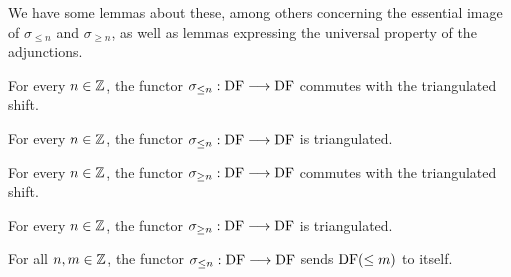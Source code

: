 \begin{definition}
\label{def-truncGEι}
\leanok
{}


\end{definition}

We have some lemmas about these, among others concerning the essential image of $\sigma_{\le n}$ and $\sigma_{\ge n}$, as well as lemmas
expressing the universal property of the adjunctions.

\begin{definition}
\label{def-truncLE_shift}
\leanok
{}

For every $n\in\mathbb{Z}$, the functor $\sigma_{\le n} : \operatorname{DF} \longrightarrow \operatorname{DF}$ commutes with the triangulated shift.

\end{definition}

\begin{proposition}
\label{prop-truncLE_tri}
\leanok
{}

For every $n\in\mathbb{Z}$, the functor $\sigma_{\le n} : \operatorname{DF} \longrightarrow \operatorname{DF}$ is triangulated.

\end{proposition}

\begin{definition}
\label{def-truncGE_shift}
\leanok
{}

For every $n\in\mathbb{Z}$, the functor $\sigma_{\ge n} : \operatorname{DF} \longrightarrow \operatorname{DF}$ commutes with the triangulated shift.

\end{definition}

\begin{proposition}
\label{prop-truncGE_tri}
\leanok
{}

For every $n\in\mathbb{Z}$, the functor $\sigma_{\ge n} : \operatorname{DF} \longrightarrow \operatorname{DF}$ is triangulated.

\end{proposition}

\begin{proposition}
\label{prop-truncLE_LE}
\leanok
{}

For all $n,m\in\mathbb{Z}$, the functor $\sigma_{\le n} : \operatorname{DF} \longrightarrow \operatorname{DF}$ sends $\operatorname{DF}(\le m)$ to itself.

\end{proposition}

